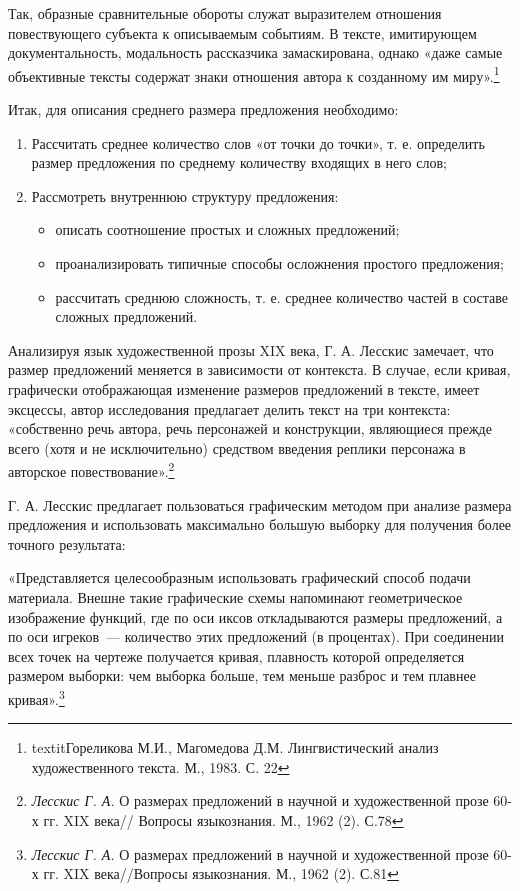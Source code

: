 \documentclass{kursa4}
\begin{document}
{{      Так, образные сравнительные обороты служат выразителем отношения повествующего субъекта к описываемым событиям. В тексте, имитирующем документальность, модальность рассказчика замаскирована, однако «даже самые объективные тексты содержат знаки отношения автора к созданному им миру».\footnote{textit{Гореликова М.И., Магомедова Д.М.} Лингвистический анализ художественного текста. М., 1983. С. 22}  

      Итак, для описания среднего размера предложения необходимо:
      \begin{enumerate}
        \item Рассчитать среднее количество слов «от точки до точки», т. е.
      определить размер предложения по среднему количеству входящих в него
      слов;
        \item Рассмотреть внутреннюю структуру предложения: 
        \begin{itemize}
          \item описать соотношение простых и сложных предложений;
          \item проанализировать типичные способы осложнения простого предложения;
          \item рассчитать среднюю сложность, т. е. среднее количество частей в
          составе сложных предложений.
        \end{itemize}
      \end{enumerate}

      Анализируя язык художественной прозы XIX века, Г. А. Лесскис
      замечает, что размер предложений меняется в зависимости от контекста.
      В случае, если кривая, графически отображающая изменение размеров
      предложений в тексте, имеет эксцессы, автор исследования предлагает
      делить текст на три контекста: «собственно речь автора, речь
      персонажей и конструкции, являющиеся прежде всего (хотя и не
      исключительно) средством введения реплики персонажа в авторское
      повествование».\footnote{\textit{{ Лесскис Г. А.
      }}{О размерах предложений в научной и художественной
      прозе 60-х гг. XIX века// Вопросы языкознания. М., 1962 (2). С.78}}

      Г. А. Лесскис предлагает пользоваться графическим методом при
      анализе размера предложения и использовать максимально большую выборку
      для получения более точного результата:

      «Представляется целесообразным использовать
      графический способ подачи материала. Внешне такие графические схемы
      напоминают геометрическое изображение функций, где по оси иксов
      откладываются размеры предложений, а по оси игреков~--- количество этих
      предложений (в процентах). При соединении всех точек на чертеже
      получается кривая, плавность которой определяется размером выборки: чем
      выборка больше, тем меньше разброс и тем плавнее
      кривая».\footnote{\textit{{ Лесскис Г. А.
      }}{О размерах предложений в научной и художественной
      прозе 60-х гг. XIX века//Вопросы языкознания. М., 1962 (2). С.81}}

}}
\end{document}
